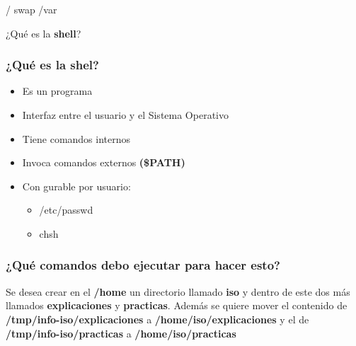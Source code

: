\begin{frame}
  \begin{center}
    \vfill
    \huge /
    \vfill
    \vfill
    \huge swap
    \vfill
    \vfill
    \huge /var
    \vfill
  \end{center}
\end{frame}

\begin{frame}
  \begin{center}
    \vfill
    \huge ¿Qué es la \textbf{shell}?
    \vfill
  \end{center}
\end{frame}

\begin{frame}
  \frametitle{¿Qué es la shel?}
  \begin{itemize}
    \item Es un programa
    \item Interfaz entre el usuario y el Sistema Operativo
    \item Tiene comandos internos
    \item Invoca comandos externos \textbf{(\$PATH)}
    \item Con gurable por usuario:
    \begin{itemize}
      \item /etc/passwd
      \item chsh
    \end{itemize}

  \end{itemize}
\end{frame}

\begin{frame}
  \frametitle{¿Qué \textbf{comandos} debo ejecutar para hacer esto?}
  \begin{center}
     Se desea crear en el \textbf{/home} un directorio llamado \textbf{iso} y dentro de este dos más llamados \textbf{explicaciones} y \textbf{practicas}. Además se quiere mover el contenido de \textbf{/tmp/info-iso/explicaciones} a \textbf{/home/iso/explicaciones} y el de \textbf{/tmp/info-iso/practicas} a \textbf{/home/iso/practicas}
  \end{center}
\end{frame}

